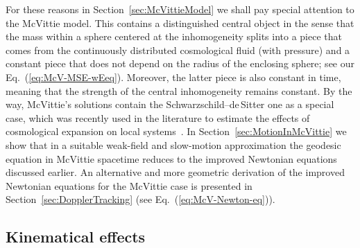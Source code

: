 \documentclass
[rmp,aps,twocolumn,showpacs,preprintnumbers,amsmath,amssymb]{revtex4}
\theoremstyle{plain}
\theoremstyle{definition}
\theoremstyle{remark}
\begin{document}
For these reasons in Section~\ref{sec:McVittieModel} we shall pay special 
attention to the McVittie model. This contains a distinguished central 
object in the sense that the mass within a sphere centered at the 
inhomogeneity splits into a piece that comes from the continuously 
distributed cosmological fluid (with pressure) and a constant piece 
that does not depend on the radius of the enclosing sphere; see our 
Eq.~(\ref{eq:McV-MSE-wEeq}). Moreover, the latter piece is also 
constant in time, meaning that the strength of the central inhomogeneity 
remains constant. By the way, McVittie's solutions contain the 
Schwarzschild--de\,Sitter one as a special case, which was recently used 
in the literature to estimate the effects of cosmological expansion on 
local systems~\cite{Kagramanova.etal:2006,Hackmann:Laemmerzahl:2008c}. 
In Section~\ref{sec:MotionInMcVittie} we show that in a suitable weak-field 
and slow-motion approximation the geodesic equation in McVittie spacetime 
reduces to the improved Newtonian equations discussed earlier. An alternative 
and more geometric derivation of the improved Newtonian equations for the 
McVittie case is presented in Section~\ref{sec:DopplerTracking} (see 
Eq.~(\ref{eq:McV-Newton-eq})).


\subsection{Kinematical effects}
\label{sec:Kinematical Effects}
%
\end{document}
